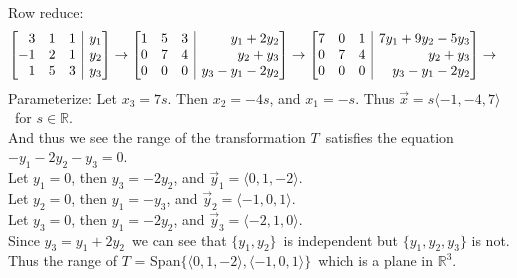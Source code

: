 \documentclass{letter}
\makeatletter
\newcommand{\Ve}[1]{\langle #1 \rangle}
\newcommand{\Vn}[1]{\vec{#1}}
\newcommand{\?}{\stackrel{?}{=}}
\newcommand\Ans[2][]{%
   \leavevmode\noindent
   {
       \begin{mdframed}[backgroundcolor=blue!10]
       #2
       \end{mdframed}
   }
}
\newenvironment{Amat}[1]{%
  \left[\begin{array}{@{}*{#1}{r}|r@{}}
}{%
  \end{array}\right]
}
\makeatother
\begin{document}
\begin{enumerate}
\begin{enumerate}[label=(\alph*)]
{    }
    \Ans{
        Row reduce:
        \begin{align*}
            &\begin{Amat}{3} 3 & 1 & 1 & y_1 \\ 
                            -1 & 2 & 1 & y_2 \\ 
                             1 & 5 & 3 & y_3 \end{Amat} \to
             \begin{Amat}{3} 1 & 5 & 3 & y_1+2y_2 \\
                             0 & 7 & 4 & y_2+y_3  \\
                             0 & 0 & 0 & y_3-y_1-2y_2 \end{Amat} \to
             \begin{Amat}{3} 7 & 0 & 1 & 7y_1+9y_2 - 5y_3 \\
                             0 & 7 & 4 & y_2+y_3 \\ 
                             0 & 0 & 0 & y_3-y_1-2y_2 \end{Amat} \to    
        \end{align*}
        Parameterize: Let $x_3=7s$.  Then $x_2=-4s$, and $x_1=-s$.  Thus $\Vn{x}=s\Ve{-1,-4,7}$\ for $s\in\mathbb{R}$.\\
        And thus we see the range of the transformation $T$\ satisfies the equation $-y_1-2y_2-y_3=0$.\\
        Let $y_1=0$, then $y_3=-2y_2$, and $\Vn{y}_1=\Ve{0,1,-2}$.\\
        Let $y_2=0$, then $y_1=-y_3$, and $\Vn{y}_2 =\Ve{-1,0,1}$.\\
        Let $y_3=0$, then $y_1=-2y_2$, and $\Vn{y}_3=\Ve{-2,1,0}$. \\
        Since $y_3 = y_1+2y_2$\ we can see that $\{y_1,y_2\}$\ is independent but $\{y_1,y_2,y_3\}$ is not.\\ 
        Thus the range of $T$ = Span$\{\Ve{0,1,-2},\Ve{-1,0,1}\}$\ which is a plane in $\mathbb{R}^3$.
    }
    
    \end{enumerate}
\end{enumerate} 
\end{document}
